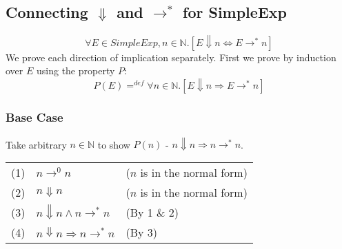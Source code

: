 \documentclass{report}
\begin{document}
\subsection*{Connecting $\Downarrow$ and $\to^*$ for SimpleExp}
\[\forall E \in SimpleExp, n \in \mathbb{N}.[E \Downarrow n \Leftrightarrow E \to^* n]\]
We prove each direction of implication separately. First we prove by induction over $E$ using the property $P$:
\[P(E) =^{def} \forall n \in \mathbb{N}.[E \Downarrow n \Rightarrow E \to^* n]\]
\subsubsection*{Base Case}
Take arbitrary $n \in \mathbb{N}$ to show $P(n)$ - $n \Downarrow n \Rightarrow n \to^* n$.
\begin{center}
	\begin{tabular}{l l l}
		(1) & $n \to^0 n$                            & ($n$ is in the normal form) \\
		(2) & $n \Downarrow n$                       & ($n$ is in the normal form) \\
		(3) & $n \Downarrow n \land n \to^* n$       & (By 1 \& 2)                 \\
		(4) & $n \Downarrow n \Rightarrow n \to^* n$ & (By 3)                      \\
	\end{tabular}
\end{center}
\end{document}
